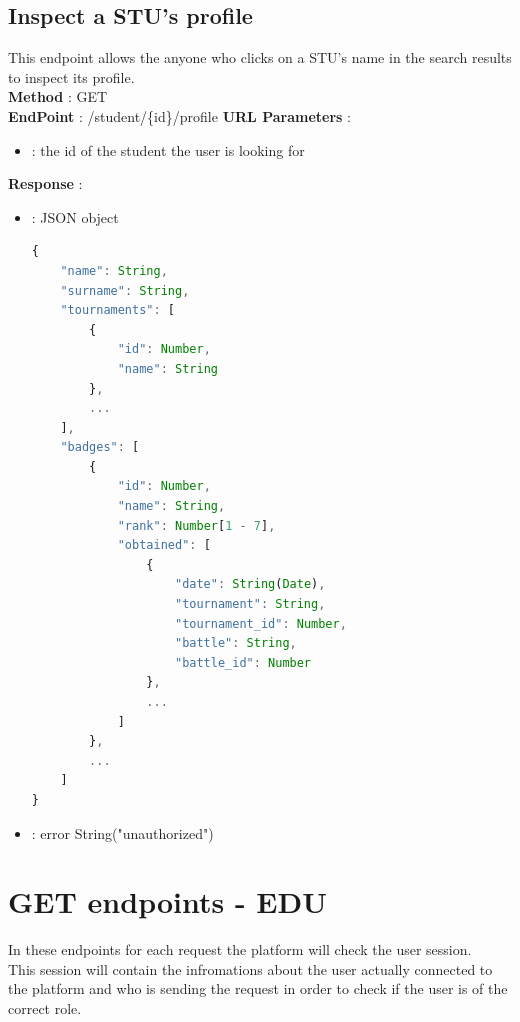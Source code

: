 \subsection*{Inspect a STU's profile}
This endpoint allows the anyone who clicks on a STU's name in the search results to inspect its profile.\\ %
\textbf{Method} : GET \\
\textbf{EndPoint} : /student/\{id\}/profile
\textbf{URL Parameters} :
    \begin{itemize}
        \item {} : the id of the student the user is looking for
    \end{itemize}
\textbf{Response} : 
    \begin{itemize}
        \item {} : JSON object
        \begin{lstlisting}[language=JavaScript, label={lst:jscode}, basicstyle=\ttfamily]
{
    "name": String,
    "surname": String,  
    "tournaments": [
        {
            "id": Number,
            "name": String
        },
        ...
    ],
    "badges": [
        {
            "id": Number,
            "name": String,
            "rank": Number[1 - 7],
            "obtained": [
                {
                    "date": String(Date),
                    "tournament": String,
                    "tournament_id": Number,
                    "battle": String,
                    "battle_id": Number
                },
                ...
            ]
        },
        ...
    ]
}
        \end{lstlisting}
        \item {} : error String("unauthorized")
    \end{itemize}



\section*{GET endpoints - EDU}
In these endpoints for each request the platform will check the user session.\\ 
This session will contain the infromations about the user actually connected to the platform and who is sending the request in order to check if the user is of the correct role.

